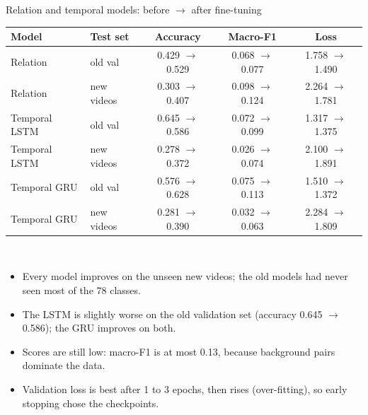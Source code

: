 \documentclass[aspectratio=169,11pt]{beamer}
\begin{document}
\begin{frame}[t]{Relation and temporal models: before $\rightarrow$ after fine-tuning}
  \centering\vspace{0.3cm}\scriptsize
  \begin{tabular}{llccc}
    \toprule
    Model & Test set & Accuracy & Macro-F1 & Loss\\
    \midrule
Relation & old val & 0.429 $\rightarrow$ 0.529 & 0.068 $\rightarrow$ 0.077 & 1.758 $\rightarrow$ 1.490\\
    Relation & new videos & 0.303 $\rightarrow$ 0.407 & 0.098 $\rightarrow$ 0.124 & 2.264 $\rightarrow$ 1.781\\
    Temporal LSTM & old val & 0.645 $\rightarrow$ 0.586 & 0.072 $\rightarrow$ 0.099 & 1.317 $\rightarrow$ 1.375\\
    Temporal LSTM & new videos & 0.278 $\rightarrow$ 0.372 & 0.026 $\rightarrow$ 0.074 & 2.100 $\rightarrow$ 1.891\\
    Temporal GRU & old val & 0.576 $\rightarrow$ 0.628 & 0.075 $\rightarrow$ 0.113 & 1.510 $\rightarrow$ 1.372\\
    Temporal GRU & new videos & 0.281 $\rightarrow$ 0.390 & 0.032 $\rightarrow$ 0.063 & 2.284 $\rightarrow$ 1.809\\
    \bottomrule
  \end{tabular}\\[5pt]
  \begin{minipage}{0.92\textwidth}\scriptsize
  \begin{itemize}\setlength\itemsep{1pt}
    \item Every model improves on the unseen new videos; the old models had never seen most of the 78 classes.
    \item The LSTM is slightly worse on the old validation set (accuracy 0.645 $\rightarrow$ 0.586); the GRU improves on both.
    \item Scores are still low: macro-F1 is at most 0.13, because background pairs dominate the data.
    \item Validation loss is best after 1 to 3 epochs, then rises (over-fitting), so early stopping chose the checkpoints.
  \end{itemize}
  \end{minipage}
\end{frame}
\end{document}
